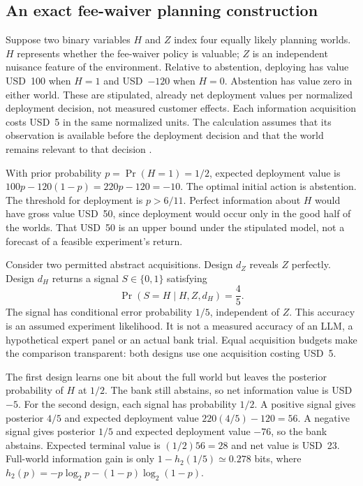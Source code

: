 \subsection{An exact fee-waiver planning construction}

Suppose two binary variables $H$ and $Z$ index four equally likely planning
worlds. $H$ represents whether the fee-waiver policy is valuable; $Z$ is an
independent nuisance feature of the environment. Relative to abstention,
deploying has value USD~100 when $H=1$ and USD~$-120$ when $H=0$.
Abstention has value zero in either world. These are stipulated, already net
deployment values per normalized deployment decision, not measured customer
effects. Each information acquisition costs USD~5 in the same normalized
units. The calculation assumes that its observation is available before the
deployment decision and that the world remains relevant to that decision
\citep{exec13_active_exact}.

With prior probability $p=\Pr(H=1)=1/2$, expected deployment value is
$100p-120(1-p)=220p-120=-10$. The optimal initial action is abstention.
The threshold for deployment is $p>6/11$. Perfect information about $H$
would have gross value USD~50, since deployment would occur only in the good
half of the worlds. That USD~50 is an upper bound under the stipulated model,
not a forecast of a feasible experiment's return.

Consider two permitted abstract acquisitions. Design $d_Z$ reveals $Z$
perfectly. Design $d_H$ returns a signal $S\in\{0,1\}$ satisfying
\[
 \Pr(S=H\mid H,Z,d_H)=\frac45.
\]
The signal has conditional error probability $1/5$, independent of $Z$.
This accuracy is an assumed experiment likelihood. It is not a measured
accuracy of an LLM, a hypothetical expert panel or an actual bank trial.
Equal acquisition budgets make the comparison transparent: both designs
use one acquisition costing USD~5.

The first design learns one bit about the full world but leaves the posterior
probability of $H$ at $1/2$. The bank still abstains, so net information value
is USD~$-5$. For the second design, each signal has probability $1/2$.
A positive signal gives posterior $4/5$ and expected deployment value
$220(4/5)-120=56$. A negative signal gives posterior $1/5$ and expected
deployment value $-76$, so the bank abstains. Expected terminal value is
$(1/2)56=28$ and net value is USD~23. Full-world information gain is only
$1-h_2(1/5)\simeq0.278$ bits, where
$h_2(p)=-p\log_2p-(1-p)\log_2(1-p)$.

